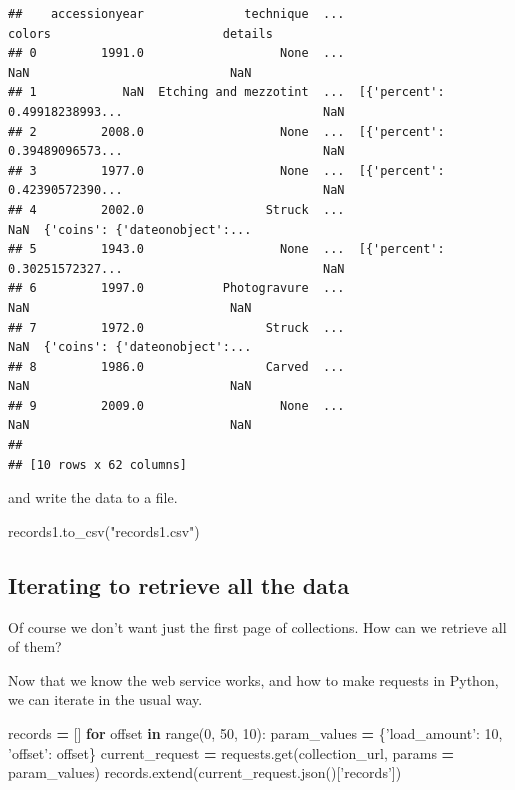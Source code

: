 \documentclass[]{book}
\newenvironment{Shaded}{\begin{snugshade}}{\end{snugshade}}
\newcommand{\BuiltInTok}[1]{#1}
\newcommand{\ControlFlowTok}[1]{\textcolor[rgb]{0.13,0.29,0.53}{\textbf{#1}}}
\newcommand{\DecValTok}[1]{\textcolor[rgb]{0.00,0.00,0.81}{#1}}
\newcommand{\KeywordTok}[1]{\textcolor[rgb]{0.13,0.29,0.53}{\textbf{#1}}}
\newcommand{\NormalTok}[1]{#1}
\newcommand{\OperatorTok}[1]{\textcolor[rgb]{0.81,0.36,0.00}{\textbf{#1}}}
\newcommand{\StringTok}[1]{\textcolor[rgb]{0.31,0.60,0.02}{#1}}
\begin{document}
\begin{verbatim}
##    accessionyear              technique  ...                         colors                        details
## 0         1991.0                   None  ...                            NaN                            NaN
## 1            NaN  Etching and mezzotint  ...  [{'percent': 0.49918238993...                            NaN
## 2         2008.0                   None  ...  [{'percent': 0.39489096573...                            NaN
## 3         1977.0                   None  ...  [{'percent': 0.42390572390...                            NaN
## 4         2002.0                 Struck  ...                            NaN  {'coins': {'dateonobject':...
## 5         1943.0                   None  ...  [{'percent': 0.30251572327...                            NaN
## 6         1997.0           Photogravure  ...                            NaN                            NaN
## 7         1972.0                 Struck  ...                            NaN  {'coins': {'dateonobject':...
## 8         1986.0                 Carved  ...                            NaN                            NaN
## 9         2009.0                   None  ...                            NaN                            NaN
## 
## [10 rows x 62 columns]
\end{verbatim}

and write the data to a file.

\begin{Shaded}
\begin{Highlighting}[]
\NormalTok{records1.to_csv(}\StringTok{"records1.csv"}\NormalTok{)}
\end{Highlighting}
\end{Shaded}

\hypertarget{iterating-to-retrieve-all-the-data}{%
\subsection{Iterating to retrieve all the data}\label{iterating-to-retrieve-all-the-data}}

Of course we don't want just the first page of collections. How can we retrieve all of them?

Now that we know the web service works, and how to make requests in Python, we can iterate in the usual way.

\begin{Shaded}
\begin{Highlighting}[]
\NormalTok{records }\OperatorTok{=}\NormalTok{ []}
\ControlFlowTok{for}\NormalTok{ offset }\KeywordTok{in} \BuiltInTok{range}\NormalTok{(}\DecValTok{0}\NormalTok{, }\DecValTok{50}\NormalTok{, }\DecValTok{10}\NormalTok{):}
\NormalTok{    param_values }\OperatorTok{=}\NormalTok{ \{}\StringTok{'load_amount'}\NormalTok{: }\DecValTok{10}\NormalTok{, }\StringTok{'offset'}\NormalTok{: offset\}}
\NormalTok{    current_request }\OperatorTok{=}\NormalTok{ requests.get(collection_url, params }\OperatorTok{=}\NormalTok{ param_values)}
\NormalTok{    records.extend(current_request.json()[}\StringTok{'records'}\NormalTok{])}
\end{Highlighting}
\end{Shaded}
\end{document}

